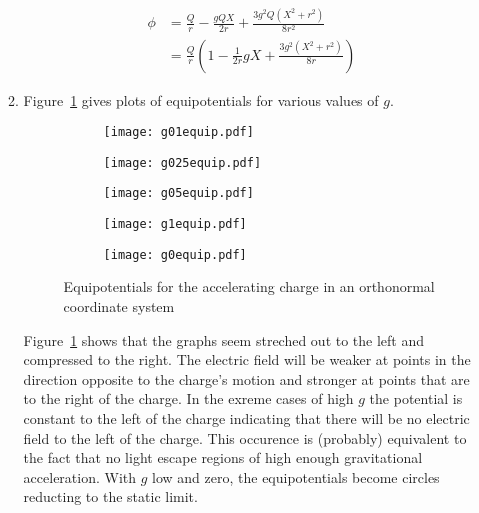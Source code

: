 \documentclass[12pt,a4]{article}
\begin{document}
\begin{enumerate}
\begin{enumerate}
\begin{align*}
          \phi &= \frac{Q}{r} -\frac{g Q X}{2 r}+ \frac{3 g ^2Q (X^2+r^2) }{8 r^2}\\
               &= \frac{Q}{r}\left(1 -\frac{1}{2 r}gX+ \frac{3 g ^2 (X^2+r^2) }{8 r}\right)
        \end{align*}
      \item
        Figure~\ref{fig:equipgraphs} gives plots of equipotentials for various values of $g$.
        \begin{figure}[H]
          \centering
          \begin{subfigure}[a]{.4\textwidth}
            \texttt{[image: g01equip.pdf]}
          \end{subfigure}
          \begin{subfigure}[a]{.4\textwidth}
            \texttt{[image: g025equip.pdf]}
          \end{subfigure}
          \begin{subfigure}[a]{.4\textwidth}
            \texttt{[image: g05equip.pdf]}
          \end{subfigure}
          \begin{subfigure}[a]{.4\textwidth}
            \texttt{[image: g1equip.pdf]}
          \end{subfigure}
          \begin{subfigure}[a]{.4\textwidth}
            \texttt{[image: g0equip.pdf]}
          \end{subfigure}
          \caption{Equipotentials for the accelerating charge in an orthonormal coordinate system}
          \label{fig:equipgraphs}
        \end{figure}
        Figure~\ref{fig:equipgraphs} shows that the graphs seem streched out to the left and compressed to the right.
        The electric field will be weaker at points in the direction opposite to the charge's motion and stronger at points that are to the right of the charge.
        In the exreme cases of high $g$ the potential is constant to the left of the charge indicating that there will be no electric field to the left of the charge.
        This occurence is (probably) equivalent to the fact that no light escape regions of high enough gravitational acceleration.
        With $g$ low and zero, the equipotentials become circles reducting to the static limit.

\end{enumerate}
\end{enumerate}
\end{document}

